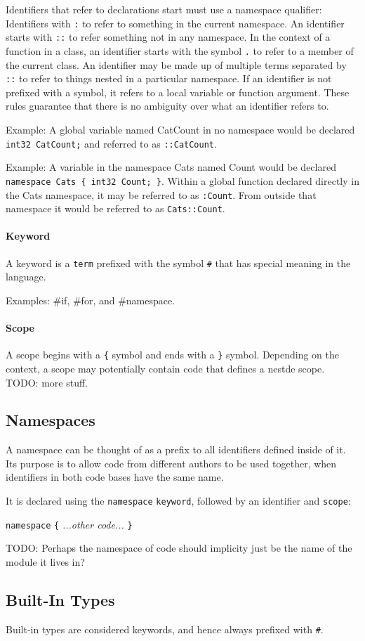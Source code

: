 \documentclass{article}
\newcommand{\code}[1]{\colorbox{light-gray}{\texttt{#1}}}
\newcommand{\breakingparagraph}[1]{\paragraph{#1}\mbox{}\medbreak}
\begin{document}
Identifiers that refer to declarations start must use a namespace qualifier: Identifiers with \code{:} to refer to something in the current namespace.  An identifier starts with \code{::} to refer something not in any namespace.  In the context of a function in a class, an identifier starts with the symbol \code{.} to refer to a member of the current class.  An identifier may be made up of multiple terms separated by \code{::} to refer to things nested in a particular namespace.  If an identifier is not prefixed with a symbol, it refers to a local variable or function argument.  These rules guarantee that there is no ambiguity over what an identifier refers to.

Example: A global variable named CatCount in no namespace would be declared \code{int32 CatCount;} and referred to as \code{::CatCount}.

Example: A variable in the namespace Cats named Count would be declared \code{namespace Cats \{ int32 Count; \}}.  Within a global function declared directly in the Cats namespace, it may be referred to as \code{:Count}.  From outside that namespace it would be referred to as \code{Cats::Count}.

\breakingparagraph{Keyword}
A keyword is a \code{term} prefixed with the symbol \code{\#} that has special meaning in the language.

Examples: \#if, \#for, and \#namespace.

\breakingparagraph{Scope}
A scope begins with a \code{\{} symbol and ends with a \code{\}} symbol.  Depending on the context, a scope may potentially contain code that defines a nestde scope.  TODO: more stuff.

\subsection{Namespaces}
A namespace can be thought of as a prefix to all identifiers defined inside of it.  Its purpose is to allow code from different authors to be used together, when identifiers in both code bases have the same name.

It is declared using the \code{namespace} \code{keyword}, followed by an identifier and \code{scope}:

\code{namespace}  \code{\{} \textit{...other code...} \code{\}}

TODO: Perhaps the namespace of code should implicity just be the name of the module it lives in?

\subsection{Built-In Types}
Built-in types are considered keywords, and hence always prefixed with \code{\#}.
\end{document}
